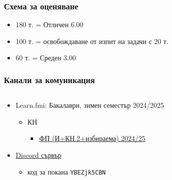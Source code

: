 \documentclass[alsotrans,beameroptions={aspectratio=169}]{beamerswitch}
\begin{document}
\begin{frame}
  \frametitle{Схема за оценяване}

  \begin{itemize}
  \item 180 т. = Отличен 6.00
  \item 100 т. = освобождаване от изпит на задачи с 20 т.
  \item 60 т. = Среден 3.00
  \end{itemize}
\end{frame}

\begin{frame}
  \frametitle{Канали за комуникация}
          \begin{columns}[T,onlytextwidth]
            \begin{column}{.7\textwidth}
            \begin{itemize}
            \item Learn.fmi: Бакалаври, зимен семестър 2024/2025
              \begin{itemize}
              \item КН
                \begin{itemize}
                \item \href{https://learn.fmi.uni-sofia.bg/course/view.php?id=10481}{ФП (И+КН.2+избираема) 2024/25}
                \end{itemize}
              \end{itemize}
              \vspace{7ex}
            \item \href{https://discord.gg/YBEZjk5CBN}{Discord сървър}
              \begin{itemize}
              \item код за покана \tt{YBEZjk5CBN}
              \end{itemize}
            \end{itemize}              
          \end{column}
          \begin{column}{.3\textwidth}
            
            \vspace{4ex}
          \end{column}
          \end{columns}
        \end{frame}
\end{document}
